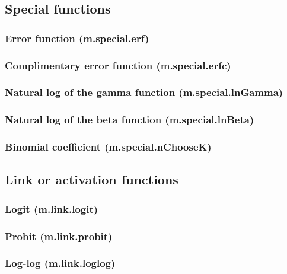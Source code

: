 \documentclass{article}
\theoremstyle{definition}
\begin{document}
\subsection{Special functions}

\subsubsection{Error function (m.special.erf)}

\subsubsection{Complimentary error function (m.special.erfc)}

\subsubsection{Natural log of the gamma function (m.special.lnGamma)}

\subsubsection{Natural log of the beta function (m.special.lnBeta)}

\subsubsection{Binomial coefficient (m.special.nChooseK)}

\subsection{Link or activation functions}

\subsubsection{Logit (m.link.logit)}

\subsubsection{Probit (m.link.probit)}

\subsubsection{Log-log (m.link.loglog)}
\end{document}
